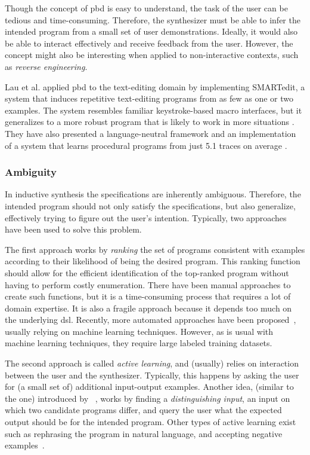 Though the concept of \gls{pbd} is easy to understand, the task of the user can
be tedious and time-consuming. Therefore, the synthesizer must be able to infer
the intended program from a small set of user demonstrations.
Ideally, it would also be able to interact effectively and receive feedback from
the user.
However, the concept might also be interesting when applied to non-interactive
contexts, such as \textit{reverse engineering}.

Lau et al. applied \gls{pbd} to the text-editing domain by implementing
SMARTedit, a system that induces repetitive text-editing programs from as few as
one or two examples. The system resembles familiar keystroke-based macro
interfaces, but it generalizes to a more robust program that is likely to work
in more situations \cite{Lau2003}.
They have also presented a language-neutral framework and an implementation of a
system that learns procedural programs from just 5.1 traces on average
\cite{Lau:traces:2003}.

\subsubsection{Ambiguity}
\label{sec:ambiguity}

In inductive synthesis the specifications are inherently ambiguous.
Therefore, the intended program should not only satisfy the specifications,
but also generalize, effectively trying to figure out the user's intention.
Typically, two approaches have been used to solve this problem.

The first approach works by \textit{ranking} the set of programs consistent with
examples according to their likelihood of being the desired program.
This ranking function should allow for the efficient identification of the
top-ranked program without having to perform costly enumeration.
There have been manual approaches to create such functions, but it is a
time-consuming process that requires a lot of domain expertise.
It is also a fragile approach because it depends too much on the underlying
\gls{dsl}.
Recently, more automated approaches have been proposed~\cite{Singh:ranking:2015,
  Ramsey:2017:LTL}, usually relying on machine learning techniques.
However, as is usual with machine learning techniques, they require large
labeled training datasets.

The second approach is called \textit{active learning}, and (usually) relies
on interaction between the user and the synthesizer.
Typically, this happens by asking the user for (a small set of) additional
input-output examples.
Another idea, (similar to the one) introduced by
\citeauthor{Jha:oracle:2010}~\cite{Jha:oracle:2010}, works by finding a
\textit{distinguishing input}, an input on which two candidate programs differ,
and query the user what the expected output should be for the intended program.
Other types of active learning exist such as rephrasing the program in natural
language, and accepting negative examples~\cite{Frankle:2016:EST}.


